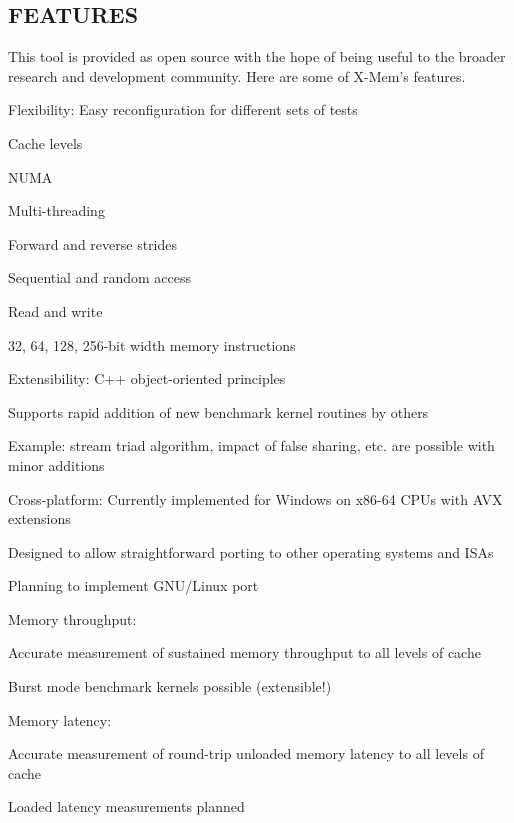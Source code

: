  \subsection*{F\-E\-A\-T\-U\-R\-E\-S }

This tool is provided as open source with the hope of being useful to the broader research and development community. Here are some of X-\/\-Mem's features.

Flexibility\-: Easy reconfiguration for different sets of tests
\begin{DoxyItemize}
\item Cache levels
\item N\-U\-M\-A
\item Multi-\/threading
\item Forward and reverse strides
\item Sequential and random access
\item Read and write
\item 32, 64, 128, 256-\/bit width memory instructions
\end{DoxyItemize}

Extensibility\-: C++ object-\/oriented principles
\begin{DoxyItemize}
\item Supports rapid addition of new benchmark kernel routines by others
\item Example\-: stream triad algorithm, impact of false sharing, etc. are possible with minor additions
\end{DoxyItemize}

Cross-\/platform\-: Currently implemented for Windows on x86-\/64 C\-P\-Us with A\-V\-X extensions
\begin{DoxyItemize}
\item Designed to allow straightforward porting to other operating systems and I\-S\-As
\item Planning to implement G\-N\-U/\-Linux port
\end{DoxyItemize}

Memory throughput\-:
\begin{DoxyItemize}
\item Accurate measurement of sustained memory throughput to all levels of cache
\item Burst mode benchmark kernels possible (extensible!)
\end{DoxyItemize}

Memory latency\-:
\begin{DoxyItemize}
\item Accurate measurement of round-\/trip unloaded memory latency to all levels of cache
\item Loaded latency measurements planned
\end{DoxyItemize}

